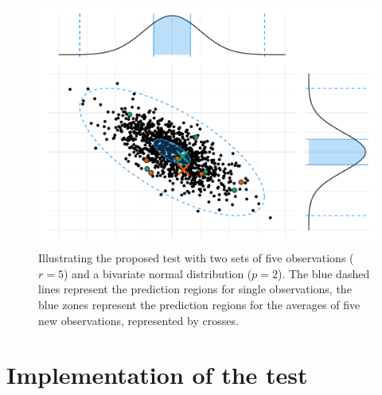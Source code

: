             \begin{figure}[htpb]
                \centering
                \includegraphics[width=0.9\linewidth]{img/experiment/non_regression/statistics/several_points.pdf}
                \caption{Illustrating the proposed test with two sets of five observations (\(r=5\)) and a bivariate normal
                distribution (\(p=2\)). The blue dashed lines represent the  prediction regions for
                single observations, the blue zones represent the  prediction regions for the averages of
                five new observations, represented by crosses.}%
                \label{fig:non_regression:stat:several_points}
            \end{figure}


    \section{Implementation of the test}%
    \label{sec:test:implementation}
